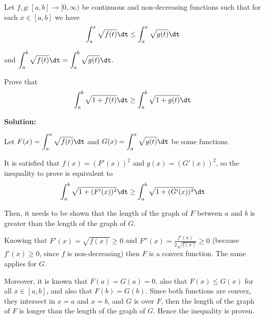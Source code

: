 \documentclass[../../main.tex]{subfiles}
\begin{document}
  \begin{shaded}
    Let $f, g: [a, b] \to [0, \infty)$ be continuous and non-decreasing functions such that for each $x \in [a, b]$ we have
    $$
    \int_a^x \sqrt{f(t)}\dt \leq \int_a^x \sqrt{g(t)}\dt
    $$

    and $\displaystyle\int_a^b \sqrt{f(t)}\dt = \displaystyle\int_a^b \sqrt{g(t)}\dt$.

    Prove that
    $$
    \int_a^b \sqrt{1 + f(t)}\dt \geq \int_a^b \sqrt{1 + g(t)}\dt
    $$
  \end{shaded}

  \textbf{Solution:}

  Let $F(x) = \displaystyle\int_a^x \sqrt{f(t)}\dt$ and $G(x) = \displaystyle\int_a^x \sqrt{g(t)}\dt$ be some functions.

  It is satisfied that $f(x) = (F'(x))^2$ and $g(x) = (G'(x))^2$, so the inequality to prove is equivalent to 
  $$
  \int_a^b \sqrt{1 + (F'(x))^2}\dt \geq \int_a^b \sqrt{1 + (G'(x))^2}\dt
  $$

  Then, it needs to be shown that the length of the graph of $F$ between $a$ and $b$ is greater than the length of the graph of $G$.

  Knowing that $F'(x) = \sqrt{f(x)} \geq 0$ and $F''(x) = \frac{f'(x)}{2\sqrt{f(x)}} \geq 0$ (because $f'(x) \geq 0$, since $f$ is non-decreasing) then $F$ is a convex function. The same applies for $G$.

  Moreover, it is known that $F(a) = G(a) = 0$, also that $F(x) \leq G(x)$ for all $x \in [a, b]$, and also that $F(b) = G(b)$. Since both functions are convex, they intersect in $x = a$ and $x = b$, and $G$ is over $F$, then the length of the graph of $F$ is longer than the length of the graph of $G$. Hence the inequality is proven.
\end{document}
